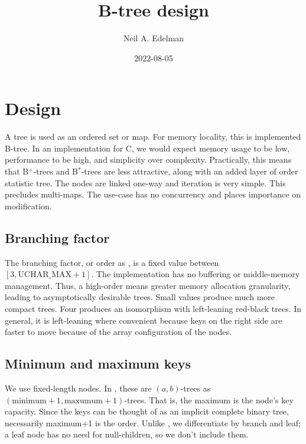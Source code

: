 \documentclass[12pt]{article}
\author{Neil A. Edelman}
\title{B-tree design}
\date{2022-08-05}
\begin{document}
\maketitle


\section{Design}

A tree is used as an ordered set or map. For memory locality, this is implemented B-tree\cite{bayer1972organization}. In an implementation for C, we would expect memory usage to be low, performance to be high, and simplicity over complexity. Practically, this means that B$^+$-trees and B$^*$-trees are less attractive, along with an added layer of order statistic tree. The nodes are linked one-way and iteration is very simple. This precludes multi-maps. The use-case has no concurrency and places importance on modification.

\subsection{Branching factor}

The branching factor, or order as \cite{knuth1997sorting}, is a fixed value between $[3,\text{UCHAR\_MAX}+1]$. The implementation has no buffering or middle-memory management. Thus, a high-order means greater memory allocation granularity, leading to asymptotically desirable trees. Small values produce much more compact trees. Four produces an isomorphism with left-leaning red-black trees\cite{sedgewick2008left}. In general, it is left-leaning where convenient because keys on the right side are faster to move because of the array configuration of the nodes.

\subsection{Minimum and maximum keys}

We use fixed-length nodes. In \cite{goodrich2011data}, these are $(a,b)$-trees as $(\text{minimum}+1, \text{maxumum}+1)$\nobreakdash-trees. That is, the maximum is the node's key capacity. Since the keys can be thought of as an implicit complete binary tree, necessarily maximum+1 is the order. Unlike \cite{knuth1997sorting}, we differentiate by branch and leaf; a leaf node has no need for null-children, so we don't include them.
\end{document}
